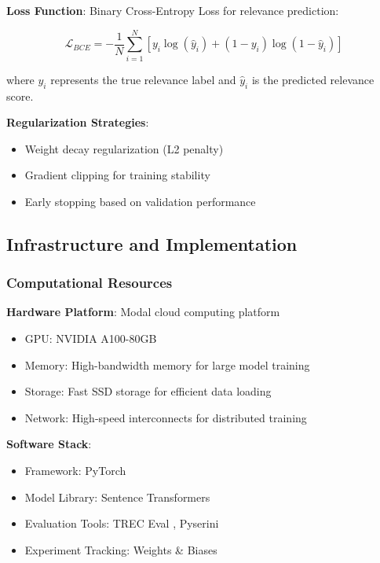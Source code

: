 \textbf{Loss Function}: Binary Cross-Entropy Loss for relevance prediction:

\begin{equation}
\mathcal{L}_{BCE} = -\frac{1}{N} \sum_{i=1}^{N} [y_i \log(\hat{y}_i) + (1-y_i) \log(1-\hat{y}_i)]
\end{equation}

where $y_i$ represents the true relevance label and $\hat{y}_i$ is the predicted relevance score.

\textbf{Regularization Strategies}:
\begin{itemize}
    \item Weight decay regularization (L2 penalty)
    \item Gradient clipping for training stability
    \item Early stopping based on validation performance
\end{itemize}

\subsection{Infrastructure and Implementation}

\subsubsection{Computational Resources}

\textbf{Hardware Platform}: Modal cloud computing platform \cite{modal_labs}
\begin{itemize}
    \item GPU: NVIDIA A100-80GB
    \item Memory: High-bandwidth memory for large model training
    \item Storage: Fast SSD storage for efficient data loading
    \item Network: High-speed interconnects for distributed training
\end{itemize}

\textbf{Software Stack}:
\begin{itemize}
    \item Framework: PyTorch \cite{paszke2019pytorchimperativestylehighperformance}
    \item Model Library: Sentence Transformers \cite{reimers2019sentence}
    \item Evaluation Tools: TREC Eval \cite{trec_eval_github}, Pyserini \cite{lin2021pyserini}
    \item Experiment Tracking: Weights \& Biases \cite{wandb2020}
\end{itemize}

